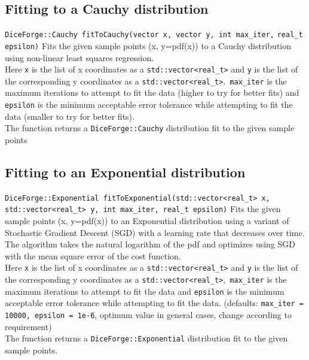 \documentclass[titlepage, 11pt]{article}
\newcommand{\code}[1]
{\colorbox{light-gray}{\texttt{#1}}}
\begin{document}
\subsection{Fitting to a Cauchy distribution}
\code{DiceForge::Cauchy fitToCauchy(vector x, vector y, int max\_iter,}
\newline
\code{real\_t epsilon)}
\newline
\newline
Fits the given sample points (x, y=pdf(x)) to a Cauchy distribution using non-linear least squares regression.
\newline\\
Here \code{x} is the list of x coordinates as a \code{std::vector<real\_t>} and \code{y} is the list of the corresponding y coordinates as a \code{std::vector<real\_t>}.\
\code{max\_iter} is the maximum iterations to attempt to fit the data (higher to try for better fits) and \code{epsilon} is the minimum acceptable error tolerance while attempting to fit the data (smaller to try for better fits).\\
\newline
The function returns a \code{DiceForge::Cauchy} distribution fit to the given sample points

\subsection{Fitting to an Exponential distribution}
\code{DiceForge::Exponential fitToExponential(std::vector<real\_t> x, }
\newline
\code{std::vector<real\_t> y, int max\_iter, real\_t epsilon)}
\newline
\newline
Fits the given sample points (x, y=pdf(x)) to an Exponential distribution using a variant of Stochastic Gradient Descent (SGD) with a learning rate that decreases over time. The algorithm takes the natural logarithm of the pdf and optimizes using SGD with the mean square error of the cost function.
\newline\\
Here \code{x} is the list of x coordinates as a \code{std::vector<real\_t>} and \code{y} is the list of the corresponding y coordinates as a \code{std::vector<real\_t>},\
\code{max\_iter} is the maximum iterations to attempt to fit the data and \code{epsilon} is the minimum acceptable error tolerance while attempting to fit the data.
\newline
(defaults:
\code{max\_iter = 10000, epsilon = 1e-6}, optimum value in general cases, change according to requirement)\\
\newline
The function returns a \code{DiceForge::Exponential} distribution fit to the given sample points.
\end{document}
